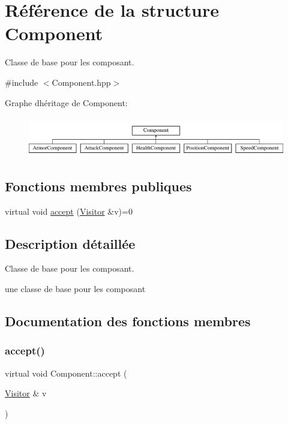 \hypertarget{structComponent}{}\section{Référence de la structure Component}
\label{structComponent}


Classe de base pour les composant.  




{\ttfamily \#include $<$Component.\+hpp$>$}

Graphe d\textquotesingle{}héritage de Component\+:\begin{figure}[H]
\begin{center}
\leavevmode
\includegraphics[height=1.763780cm]{structComponent}
\end{center}
\end{figure}
\subsection*{Fonctions membres publiques}
\begin{DoxyCompactItemize}
\item 
virtual void \hyperlink{structComponent_a1d42068fda4a9bf6571810f669b3bb21}{accept} (\hyperlink{classVisitor}{Visitor} \&v)=0
\end{DoxyCompactItemize}


\subsection{Description détaillée}
Classe de base pour les composant. 

une classe de base pour les composant 

\subsection{Documentation des fonctions membres}
\mbox{\label{structComponent_a1d42068fda4a9bf6571810f669b3bb21}} 
\subsubsection{\texorpdfstring{accept()}{accept()}}
{\footnotesize\ttfamily virtual void Component\+::accept (\begin{DoxyParamCaption}\item[{\hyperlink{classVisitor}{Visitor} \&}]{v }\end{DoxyParamCaption})\hspace{0.3cm}{\ttfamily [pure virtual]}}

